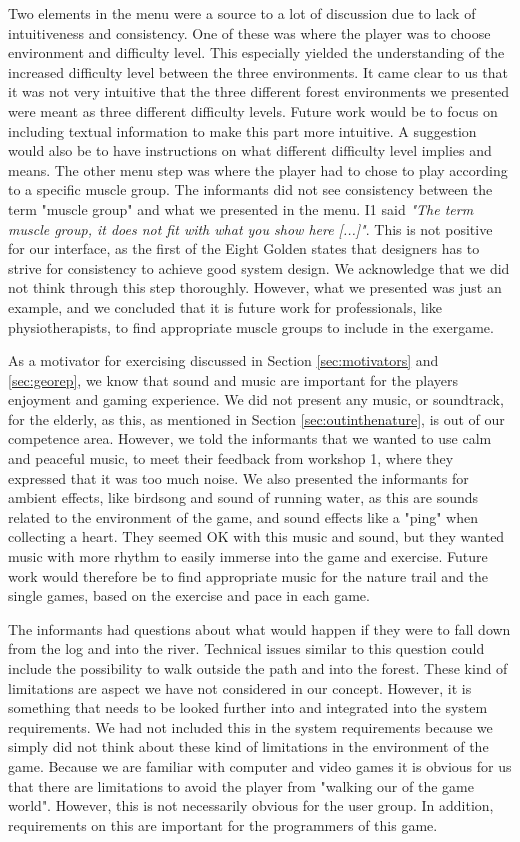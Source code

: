 Two elements in the menu were a source to a lot of discussion due to lack of intuitiveness and consistency. One of these was where the player was to choose environment and difficulty level. This especially yielded the understanding of the increased difficulty level between the three environments. It came clear to us that it was not very intuitive that the three different forest environments we presented were meant as three different difficulty levels. Future work would be to focus on including textual information to make this part more intuitive. A suggestion would also be to have instructions on what different difficulty level implies and means. The other menu step was where the player had to chose to play according to a specific muscle group. The informants did not see consistency between the term "muscle group" and what we presented in the menu. I1 said \emph{"The term muscle group, it does not fit with what you show here [...]"}. This is not positive for our interface, as the first of the Eight Golden states that designers has to strive for consistency to achieve good system design. We acknowledge that we did not think through this step thoroughly. However, what we presented was just an example, and we concluded that it is future work for professionals, like physiotherapists, to find appropriate muscle groups to include in the exergame.

As a motivator for exercising discussed in Section \ref{sec:motivators} and \ref{sec:georep}, we know that sound and music are important for the players enjoyment and gaming experience. We did not present any music, or soundtrack, for the elderly, as this, as mentioned in Section \ref{sec:outinthenature}, is out of our competence area. However, we told the informants that we wanted to use calm and peaceful music, to meet their feedback from workshop 1, where they expressed that it was too much noise. We also presented the informants for ambient effects, like birdsong and sound of running water, as this are sounds related to the environment of the game, and sound effects like a "ping" when collecting a heart. They seemed OK with this music and sound, but they wanted music with more rhythm to easily immerse into the game and exercise. Future work would therefore be to find appropriate music for the nature trail and the single games, based on the exercise and pace in each game. 

The informants had questions about what would happen if they were to fall down from the log and into the river. Technical issues similar to this question could include the possibility to walk outside the path and into the forest. These kind of limitations are aspect we have not considered in our concept. However, it is something that needs to be looked further into and integrated into the system requirements. We had not included this in the system requirements because we simply did not think about these kind of limitations in the environment of the game. Because we are familiar with computer and video games it is obvious for us that there are limitations to avoid the player from "walking our of the game world". However, this is not necessarily obvious for the user group. In addition, requirements on this are important for the programmers of this game. 

